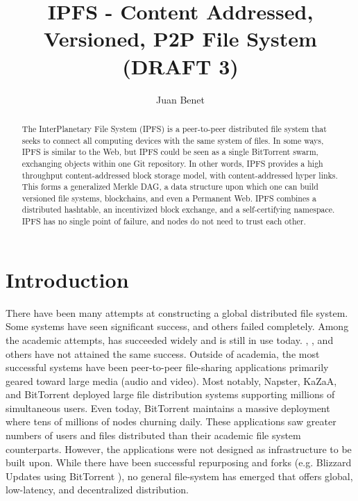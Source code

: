 \documentclass{sig-alternate}
\begin{document}
\title{IPFS - Content Addressed, Versioned, P2P File System (DRAFT 3)}
\subtitle{}


\author{
\alignauthor
  Juan Benet\\
}

\maketitle
\begin{abstract}
The InterPlanetary File System (IPFS) is a peer-to-peer distributed file system that seeks to connect all computing devices with the same system of files. In some ways, IPFS is similar to the Web, but IPFS could be seen as a single BitTorrent swarm, exchanging objects within one Git repository. In other words, IPFS provides a high throughput content-addressed block storage model, with content-addressed hyper links. This forms a generalized Merkle DAG, a data structure upon which one can build versioned file systems, blockchains, and even a Permanent Web. IPFS combines a distributed hashtable, an incentivized block exchange, and a self-certifying namespace. IPFS has no single point of failure, and nodes do not need to trust each other.
\end{abstract}

\section{Introduction}

There have been many attempts at constructing a global distributed file system. Some systems have seen significant success, and others failed completely. Among the academic attempts, \cite{AFS} has succeeded widely and is still in use today. \cite{Oceanstore}, \cite{CFS}, and others have not attained the same success. Outside of academia, the most successful systems have been peer-to-peer file-sharing applications primarily geared toward large media (audio and video). Most notably, Napster, KaZaA, and BitTorrent \cite{BitTorrent} deployed large file distribution systems supporting millions of simultaneous users. Even today, BitTorrent maintains a massive deployment where tens of millions of nodes churning daily. These applications saw greater numbers of users and files distributed than their academic file system counterparts. However, the applications were not designed as infrastructure to be built upon. While there have been successful repurposing and forks (e.g. Blizzard Updates using BitTorrent \cite{Blizzard}), no general file-system has emerged that offers global, low-latency, and decentralized distribution.
\end{document}
